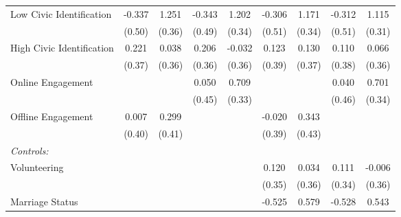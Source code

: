 \begin{table}[htbp]
\begin{tabular}{l*{8}{c}}
\hspace{0.25cm} Low Civic Identification&-0.337         &1.251\sym{**} &-0.343         &1.202\sym{***}&-0.306         &1.171\sym{**} &-0.312         &1.115\sym{***}\\
                              &(0.50)         &(0.36)         &(0.49)         &(0.34)         &(0.51)         &(0.34)         &(0.51)         &(0.31)         \\
\hspace{0.25cm} High Civic Identification&0.221         &0.038         &0.206         &-0.032         &0.123         &0.130         &0.110         &0.066         \\
                              &(0.37)         &(0.36)         &(0.36)         &(0.36)         &(0.39)         &(0.37)         &(0.38)         &(0.36)         \\
\hspace{0.25cm} Online Engagement&              &              &0.050         &0.709\sym{*}  &              &              &0.040         &0.701\sym{*}  \\
                              &              &              &(0.45)         &(0.33)         &              &              &(0.46)         &(0.34)         \\
\hspace{0.25cm} Offline Engagement&0.007         &0.299         &              &              &-0.020         &0.343         &              &              \\
                              &(0.40)         &(0.41)         &              &              &(0.39)         &(0.43)         &              &              \\
\emph{Controls:}              &              &              &              &              &              &              &              &              \\
\hspace{0.25cm} Volunteering  &              &              &              &              &0.120         &0.034         &0.111         &-0.006         \\
                              &              &              &              &              &(0.35)         &(0.36)         &(0.34)         &(0.36)         \\
\hspace{0.25cm} Marriage Status&              &              &              &              &-0.525\sym{*}  &0.579\sym{**} &-0.528\sym{*}  &0.543\sym{**} \\

\end{tabular}
\end{table}
